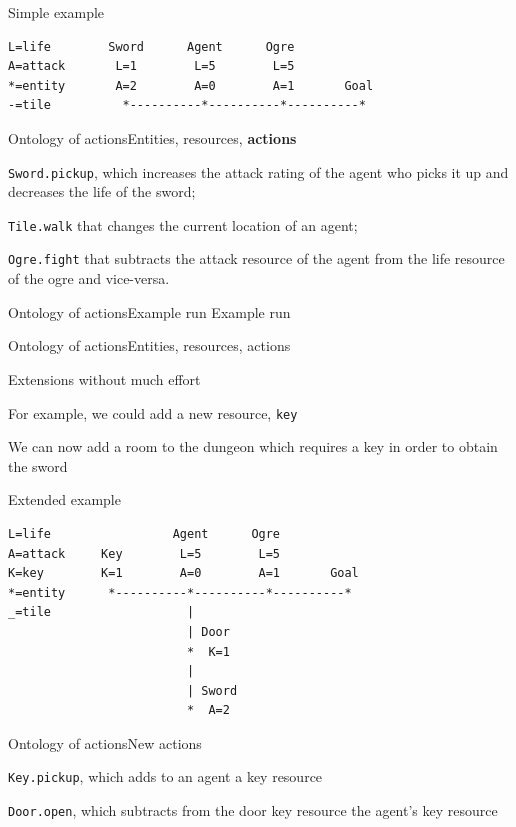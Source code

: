 \documentclass{beamer}
\begin{document}
\begin{frame}[fragile]{Simple example}
\begin{lstlisting}
L=life        Sword      Agent      Ogre
A=attack       L=1        L=5        L=5
*=entity       A=2        A=0        A=1       Goal
-=tile          *----------*----------*----------*
\end{lstlisting}
\end{frame}

\begin{slide}{Ontology of actions}{Entities, resources, \textbf{actions}}{
\item \texttt{Sword.pickup}, which increases the attack rating of the agent who picks it up and decreases the life of the sword;
\item \texttt{Tile.walk} that changes the current location of an agent;
\item \texttt{Ogre.fight} that subtracts the attack resource of the agent from the life resource of the ogre and vice-versa.
}\end{slide}

\begin{textslide}{Ontology of actions}{Example run}{
Example run
}\end{textslide}

\begin{slide}{Ontology of actions}{Entities, resources, actions}{
\item Extensions without much effort
\item For example, we could add a new resource, \texttt{key}
\item We can now add a room to the dungeon which requires a key in order to obtain the sword
}\end{slide}

\begin{frame}[fragile]{Extended example}
\begin{lstlisting}
L=life                 Agent      Ogre
A=attack     Key        L=5        L=5
K=key        K=1        A=0        A=1       Goal
*=entity      *----------*----------*----------*
_=tile                   |
                         | Door
                         *  K=1
                         |
                         | Sword
                         *  A=2
\end{lstlisting}
\end{frame}

\begin{slide}{Ontology of actions}{New actions}{
\item \texttt{Key.pickup}, which adds to an agent a key resource
\item \texttt{Door.open}, which subtracts from the door key resource the agent's key resource
}\end{slide}
\end{document}
